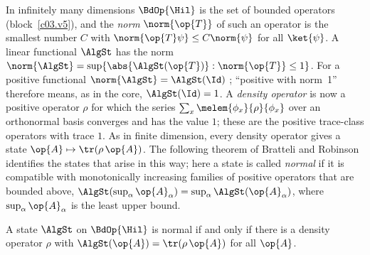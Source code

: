 \begin{vertiefung}[id=c04.v1,
    titel={States in infinitely many dimensions},
    wozu={In the core the positive normalised functionals are exactly the density operators
      (Proposition~\ref{c04.prop.funktionale}). P2 says ``in the trace-class case'', and that is a
      restriction: in infinitely many dimensions there are states that come from no density
      operator. This block identifies the states represented by density operators and gives a
      state that is not represented by one.},
    voraussetzung={Section~\ref{c04.s1.1}; blocks~\ref{c03.v1} and~\ref{c03.v5} (bounded
      operators). The core does not need this block.},
    zurueck={The density operators are the normal states. In finite dimension these are all
      states; in infinitely many dimensions there are others, and the course does not use them.}]
  In infinitely many dimensions $\BdOp{\Hil}$ is the set of bounded operators
  (block~\ref{c03.v5}), and the \emph{norm} $\norm{\op{T}}$ of such an operator is the smallest
  number $C$ with $\norm{\op{T}\psi} \leq C\norm{\psi}$ for all $\ket{\psi}$. A linear functional
  $\AlgSt$ has the norm $\norm{\AlgSt} = \sup\{\abs{\AlgSt(\op{T})} : \norm{\op{T}} \leq 1\}$.
  For a positive functional $\norm{\AlgSt} = \AlgSt(\Id)$ ;
  ``positive with norm~1'' therefore means, as in the core, $\AlgSt(\Id) = 1$. A
  \emph{density operator} is now a positive operator $\rho$ for which the series
  $\sum_x \melem{\phi_x}{\rho}{\phi_x}$ over an orthonormal basis converges and has the value $1$;
  these are the positive trace-class operators with trace $1$. As in finite dimension, every
  density operator gives a state $\op{A} \mapsto \tr(\rho\,\op{A})$. The following theorem of
  Bratteli and Robinson identifies the states that arise in this way; here a state is called
  \emph{normal} if it is compatible with monotonically increasing families of positive operators
  that are bounded above, $\AlgSt(\sup_\alpha \op{A}_\alpha) = \sup_\alpha \AlgSt(\op{A}_\alpha)$,
  where $\sup_\alpha \op{A}_\alpha$ is the least upper bound.

  \begin{theorem}\label{c04.thm.normal}
    A state $\AlgSt$ on $\BdOp{\Hil}$ is normal if and only if there is a density operator $\rho$
    with $\AlgSt(\op{A}) = \tr(\rho\,\op{A})$ for all $\op{A}$.
  \end{theorem}


\end{vertiefung}
